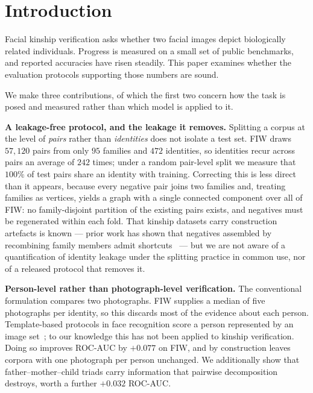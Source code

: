 \documentclass[journal,12pt]{IEEEtran}
\begin{document}
\section{Introduction}

Facial kinship verification asks whether two facial images depict biologically
related individuals. Progress is measured on a small set of public benchmarks,
and reported accuracies have risen steadily. This paper examines whether the
evaluation protocols supporting those numbers are sound.

We make three contributions, of which the first two concern how the task is
posed and measured rather than which model is applied to it.

\textbf{A leakage-free protocol, and the leakage it removes.} Splitting a
corpus at the level of \emph{pairs} rather than \emph{identities} does not
isolate a test set. FIW draws $57{,}120$ pairs from only $95$ families and
$472$ identities, so identities recur across pairs an average of $242$ times;
under a random pair-level split we measure that $100\%$ of test pairs share an
identity with training. Correcting this is less direct than it appears, because
every negative pair joins two families and, treating families as vertices,
yields a graph with a single connected component over all of FIW: no
family-disjoint partition of the existing pairs exists, and negatives must be
regenerated within each fold. That kinship datasets carry construction
artefacts is known --- prior work has shown that negatives assembled by
recombining family members admit shortcuts~\cite{TODO_samephoto} --- but we are
not aware of a quantification of identity leakage under the splitting practice
in common use, nor of a released protocol that removes it.

\textbf{Person-level rather than photograph-level verification.} The
conventional formulation compares two photographs. FIW supplies a median of
five photographs per identity, so this discards most of the evidence about each
person. Template-based protocols in face recognition score a person represented
by an image set~\cite{whitelam2017ijbb}; to our knowledge this has not been
applied to kinship verification. Doing so improves ROC-AUC by $+0.077$ on FIW,
and by construction leaves corpora with one photograph per person unchanged.
We additionally show that father--mother--child triads carry information that
pairwise decomposition destroys, worth a further $+0.032$ ROC-AUC.
\end{document}
